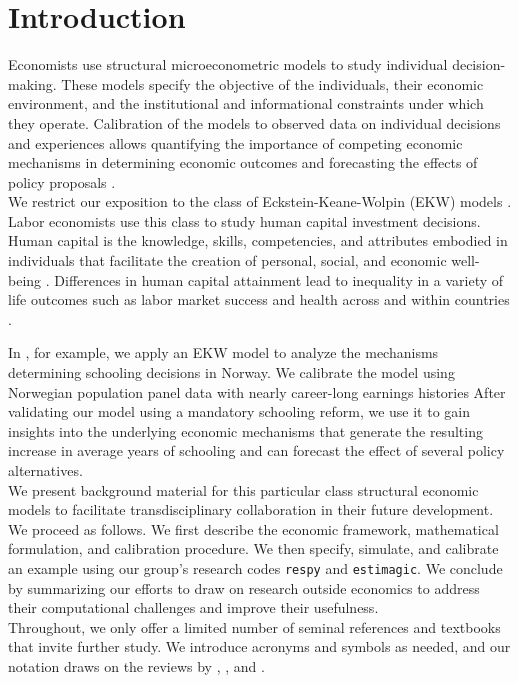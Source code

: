\section{Introduction}
\noindent Economists use structural microeconometric models to study individual decision-making. These models specify the objective of the individuals, their economic environment, and the institutional and informational constraints under which they operate. Calibration of the models to observed data on individual decisions and experiences allows quantifying the importance of competing economic mechanisms in determining economic outcomes and forecasting the effects of policy proposals \citep{Wolpin.2013}.\\

\noindent We restrict our exposition to the class of Eckstein-Keane-Wolpin (EKW) models \citep{Adda.2017, Blundell.2016, Keane.1997}. Labor economists use this class to study human capital investment decisions. Human capital is the knowledge, skills, competencies, and attributes embodied in individuals that facilitate the creation of personal, social, and economic well-being \citep{Becker.1964}. Differences in human capital attainment lead to inequality in a variety of life outcomes such as labor market success and health across and within countries \citep{OECD.2001}.

In \citet{Bhuller.2018}, for example, we apply an EKW model to analyze the mechanisms determining schooling decisions in Norway. We calibrate the model using Norwegian population panel data with nearly career-long earnings histories  After validating our model using a mandatory schooling reform, we use it to gain insights into the underlying economic mechanisms that generate the resulting increase in average years of schooling and can forecast the effect of several policy alternatives.\\

\noindent We present background material for this particular class structural economic models to facilitate transdisciplinary collaboration in their future development. We proceed as follows. We first describe the economic framework, mathematical formulation, and calibration procedure. We then specify, simulate, and calibrate an example using our group's research codes \verb+respy+ and \verb+estimagic+. We conclude by summarizing our efforts to draw on research outside economics to address their computational challenges and improve their usefulness.\\

\noindent Throughout, we only offer a limited number of seminal references and textbooks that invite further study. We introduce acronyms and symbols as needed, and our notation draws on the reviews by \cite{Aguirregabiria.2010}, \cite{Arcidiacono.2011}, and \cite{Puterman.1994}.
